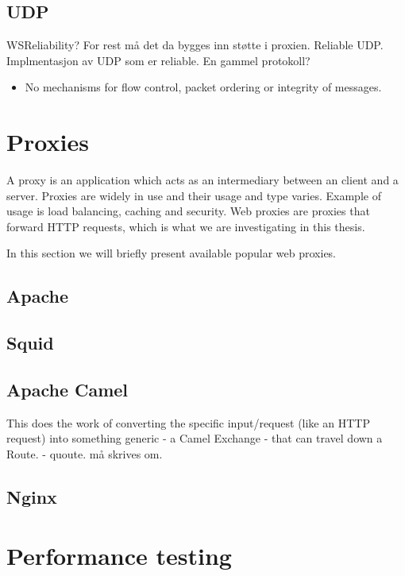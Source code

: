 \subsection{UDP}
WSReliability? For rest må det da bygges inn støtte i proxien.
Reliable UDP. Implmentasjon av UDP som er reliable. En gammel protokoll?
\begin{itemize}
    \item No mechanisms for flow control, packet ordering or integrity of
    messages.
\end{itemize}

\section{Proxies}

A proxy is an application which acts as an intermediary between an client and a
server. Proxies are widely in use and their usage and type varies. Example of
usage is load balancing, caching and security. Web proxies are proxies that
forward HTTP requests, which is what we are investigating in this thesis.

In this section we will briefly present available popular web proxies.

\subsection{Apache}

\subsection{Squid}

\subsection{Apache Camel}

This does the work of converting the specific input/request (like an HTTP
request) into something generic - a Camel Exchange - that can travel down a
Route.
 - quoute. må skrives om.

\subsection{Nginx}


\section{Performance testing}

